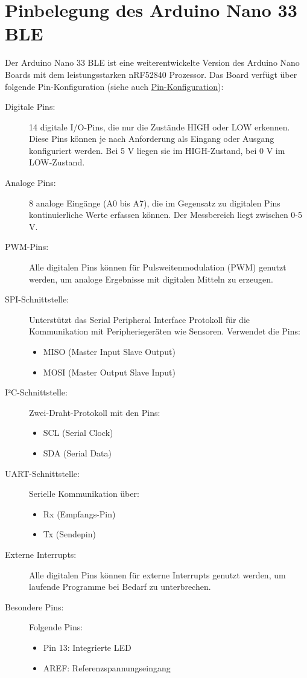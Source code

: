 \section{Pinbelegung des Arduino Nano 33 BLE}

Der Arduino Nano 33 BLE ist eine weiterentwickelte Version des Arduino Nano Boards mit dem leistungsstarken nRF52840 Prozessor. Das Board verfügt über folgende Pin-Konfiguration (siehe auch \href{https://www.etechnophiles.com/arduino-nano-33-ble-sense-pinout-introduction-specifications/}{Pin-Konfiguration}):

\begin{description}
	\item[Digitale Pins:] 14 digitale I/O-Pins, die nur die Zustände HIGH oder LOW erkennen. Diese Pins können je nach Anforderung als Eingang oder Ausgang konfiguriert werden. Bei 5 V liegen sie im HIGH-Zustand, bei 0 V im LOW-Zustand.
	\item[Analoge Pins:] 8 analoge Eingänge (A0 bis A7), die im Gegensatz zu digitalen Pins kontinuierliche Werte erfassen können. Der Messbereich liegt zwischen 0-5 V.
	\item[PWM-Pins:] Alle digitalen Pins können für Pulsweitenmodulation (PWM) genutzt werden, um analoge Ergebnisse mit digitalen Mitteln zu erzeugen.
	\item[SPI-Schnittstelle:] Unterstützt das Serial Peripheral Interface Protokoll für die Kommunikation mit Peripheriegeräten wie Sensoren. Verwendet die Pins:
	\begin{itemize}
		\item MISO (Master Input Slave Output)
		\item MOSI (Master Output Slave Input)
	\end{itemize}
	\item[I²C-Schnittstelle:] Zwei-Draht-Protokoll mit den Pins:
	\begin{itemize}
		\item SCL (Serial Clock)
		\item SDA (Serial Data)
	\end{itemize}
	\item[UART-Schnittstelle:] Serielle Kommunikation über:
	\begin{itemize}
		\item Rx (Empfangs-Pin)
		\item Tx (Sendepin)
	\end{itemize}
	\item[Externe Interrupts:] Alle digitalen Pins können für externe Interrupts genutzt werden, um laufende Programme bei Bedarf zu unterbrechen.
	\item[Besondere Pins:] Folgende Pins:
	
	\begin{itemize}
		\item Pin 13: Integrierte LED
		\item AREF: Referenzspannungseingang
	\end{itemize}
\end{description}

